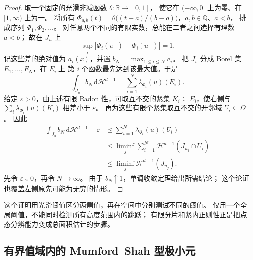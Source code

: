 \begin{proof}
取一个固定的光滑非减函数 \(\theta:\mathbb R\to[0,1]\)，
使它在 \((-\infty,0]\) 上为零、在 \([1,\infty)\) 上为一。
将所有
\(\Phi_{a,b}(t)=\theta\bigl((t-a)/(b-a)\bigr)\)，\(a,b\in\mathbb Q\)、\(a<b\)，
排成序列 \(\Phi_1,\Phi_2,\ldots\)。
对任意两个不同的有限实数，总能在二者之间选择有理数 \(a<b\)；
故在 \(J_u\) 上
\[
 \sup_i|\Phi_i(u^+)-\Phi_i(u^-)|=1.
\]
记这些差的绝对值为 \(a_i(x)\)，并置
\(b_N=\max_{1\le i\le N}a_i\)。
把 \(J_u\) 分成 Borel 集 \(E_1,\ldots,E_N\)，在 \(E_i\) 上
第 \(i\) 个函数最先达到该最大值。于是
\[
 \int_{J_u}b_N\,\mathrm d\mathcal H^{d-1}
 =\sum_{i=1}^N\lambda_{\Phi_i}(u)(E_i).
\]
给定 \(\varepsilon>0\)，由上述有限 Radon 性，可取互不交的紧集
\(K_i\subseteq E_i\)，使右侧与
\(\sum_i\lambda_{\Phi_i}(u)(K_i)\) 相差小于 \(\varepsilon\)。
再为这些有限个紧集取互不交的开邻域 \(U_i\subseteq\Omega\)。
因此
\[
 \begin{aligned}
 \int_{J_u}b_N\,\mathrm d\mathcal H^{d-1}-\varepsilon
 &\le\sum_{i=1}^N\lambda_{\Phi_i}(u)(U_i)\\
 &\le\liminf_j\sum_{i=1}^N
       \mathcal H^{d-1}(J_{u_j}\cap U_i)\\
 &\le\liminf_j\mathcal H^{d-1}(J_{u_j}).
 \end{aligned}
\]
先令 \(\varepsilon\downarrow0\)，再令 \(N\to\infty\)。
由于 \(b_N\uparrow1\)，单调收敛定理给出所需结论；
这个论证也覆盖左侧原先可能为无穷的情形。
\end{proof}

这个证明用光滑阈值区分两侧值，再在空间中分别测试不同的阈值。
仅用一个全局阈值，不能同时检测所有高度范围内的跳跃；
有限分片和紧内正则性正是把点态分辨能力变成总面积估计的步骤。

\subsection{有界值域内的 Mumford--Shah 型极小元}
\label{b1:subsec:280404}


